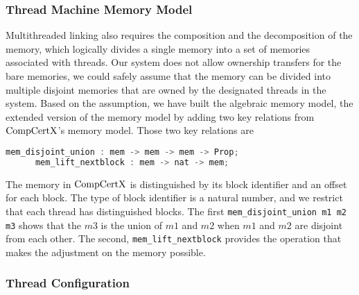 \subsubsection{Thread Machine Memory Model}


Multithreaded linking also requires the composition and the decomposition of the memory,
which logically divides a single memory into a set of memories associated with threads.
Our system does not allow ownership transfers for the bare memories, 
we could safely assume that the memory can be divided into multiple disjoint memories that are owned by the designated threads in the system. 
Based on the assumption, 
we have built the algebraic memory model, the extended version of the memory model by adding two key relations from $\mathrm{CompCertX}$'s memory model.
Those two key relations are 
\begin{lstlisting}[language=C]
      mem_disjoint_union : mem -> mem -> mem -> Prop;
      mem_lift_nextblock : mem -> nat -> mem;
\end{lstlisting}
The memory in $\mathrm{CompCertX}$ is distinguished by its block identifier and an offset for each block. 
The type of block identifier is a natural number,
and we restrict that each thread has distinguished blocks.  
The first \lstinline$mem_disjoint_union m1 m2 m3$  shows that 
the $m3$ is the union of $m1$ and $m2$ when $m1$ and $m2$ 
are disjoint from each other. 
The second, \lstinline$mem_lift_nextblock$ 
provides the operation that makes the adjustment on the memory possible. 



\subsubsection{Thread Configuration}

